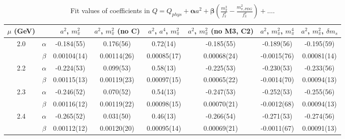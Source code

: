 \documentclass[12pt]{extarticle}
\begin{document}
\begin{table}[h!]
\begin{center}
\begin{tabular}{|c c|c|c|c|c|c|c|}
\hline
$\mu$ (GeV) &  & $a^2$, $m_\pi^2$& $a^2$, $m_\pi^2$ (no C)& $a^2$, $a^4$, $m_\pi^2$& $a^2$, $m_\pi^2$ (no M3, C2)& $a^2$, $m_\pi^2$, $m_\pi^4$& $a^2$, $m_\pi^2$, $\delta m_s$\\
\hline
\multirow{2}{0.5in}{2.0} & $\alpha$ & -0.184(55)& 0.176(56)& 0.72(14)& -0.185(55)& -0.189(56)& -0.195(59)\\
 & $\beta$ & 0.00104(14)& 0.00114(26)& 0.00085(17)& 0.00068(24)& -0.0015(76)& 0.00081(14)\\
\hline
\multirow{2}{0.5in}{2.2} & $\alpha$ & -0.224(53)& 0.099(53)& 0.58(13)& -0.225(53)& -0.230(53)& -0.233(56)\\
 & $\beta$ & 0.00115(13)& 0.00119(23)& 0.00097(15)& 0.00065(22)& -0.0014(70)& 0.00094(13)\\
\hline
\multirow{2}{0.5in}{2.3} & $\alpha$ & -0.246(52)& 0.070(52)& 0.54(13)& -0.247(53)& -0.252(53)& -0.255(56)\\
 & $\beta$ & 0.00116(12)& 0.00119(22)& 0.00098(15)& 0.00070(21)& -0.0012(68)& 0.00094(13)\\
\hline
\multirow{2}{0.5in}{2.4} & $\alpha$ & -0.265(52)& 0.031(50)& 0.46(13)& -0.266(54)& -0.271(53)& -0.274(56)\\
 & $\beta$ & 0.00112(12)& 0.00120(20)& 0.00095(14)& 0.00069(21)& -0.0011(67)& 0.00091(13)\\
\hline
\end{tabular}
\caption{Fit values of coefficients in $Q = Q_{phys} + \mathbf{\alpha} a^2 + \mathbf{\beta}\left(\frac{m_\pi^2}{f_\pi^2}-\frac{m_{\pi,PDG}^2}{f_\pi^2}\right) + \ldots$.}
\end{center}
\end{table}
























\clearpage
\end{document}
